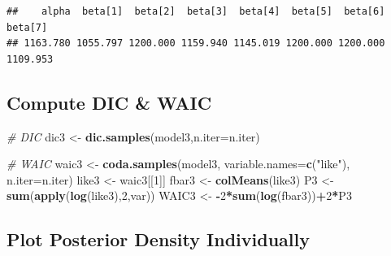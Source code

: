 \documentclass[
]{article}
\newenvironment{Shaded}{\begin{snugshade}}{\end{snugshade}}
\newcommand{\AttributeTok}[1]{\textcolor[rgb]{0.13,0.29,0.53}{#1}}
\newcommand{\CommentTok}[1]{\textcolor[rgb]{0.56,0.35,0.01}{\textit{#1}}}
\newcommand{\DecValTok}[1]{\textcolor[rgb]{0.00,0.00,0.81}{#1}}
\newcommand{\FunctionTok}[1]{\textcolor[rgb]{0.13,0.29,0.53}{\textbf{#1}}}
\newcommand{\NormalTok}[1]{#1}
\newcommand{\OtherTok}[1]{\textcolor[rgb]{0.56,0.35,0.01}{#1}}
\newcommand{\SpecialCharTok}[1]{\textcolor[rgb]{0.81,0.36,0.00}{\textbf{#1}}}
\newcommand{\StringTok}[1]{\textcolor[rgb]{0.31,0.60,0.02}{#1}}
\begin{document}
\begin{Shaded}
\end{Shaded}

\begin{verbatim}
##    alpha  beta[1]  beta[2]  beta[3]  beta[4]  beta[5]  beta[6]  beta[7] 
## 1163.780 1055.797 1200.000 1159.940 1145.019 1200.000 1200.000 1109.953
\end{verbatim}

\subsection{Compute DIC \& WAIC}\label{compute-dic-waic-2}

\begin{Shaded}
\begin{Highlighting}[]
\CommentTok{\# DIC}
\NormalTok{dic3 }\OtherTok{\textless{}{-}} \FunctionTok{dic.samples}\NormalTok{(model3,}\AttributeTok{n.iter=}\NormalTok{n.iter)}

\CommentTok{\# WAIC}
\NormalTok{waic3 }\OtherTok{\textless{}{-}} \FunctionTok{coda.samples}\NormalTok{(model3, }\AttributeTok{variable.names=}\FunctionTok{c}\NormalTok{(}\StringTok{"like"}\NormalTok{), }\AttributeTok{n.iter=}\NormalTok{n.iter)}
\NormalTok{like3 }\OtherTok{\textless{}{-}}\NormalTok{ waic3[[}\DecValTok{1}\NormalTok{]]}
\NormalTok{fbar3 }\OtherTok{\textless{}{-}} \FunctionTok{colMeans}\NormalTok{(like3)}
\NormalTok{P3 }\OtherTok{\textless{}{-}} \FunctionTok{sum}\NormalTok{(}\FunctionTok{apply}\NormalTok{(}\FunctionTok{log}\NormalTok{(like3),}\DecValTok{2}\NormalTok{,var))}
\NormalTok{WAIC3 }\OtherTok{\textless{}{-}} \SpecialCharTok{{-}}\DecValTok{2}\SpecialCharTok{*}\FunctionTok{sum}\NormalTok{(}\FunctionTok{log}\NormalTok{(fbar3))}\SpecialCharTok{+}\DecValTok{2}\SpecialCharTok{*}\NormalTok{P3}
\end{Highlighting}
\end{Shaded}

\subsection{Plot Posterior Density
Individually}\label{plot-posterior-density-individually-2}
\end{document}
